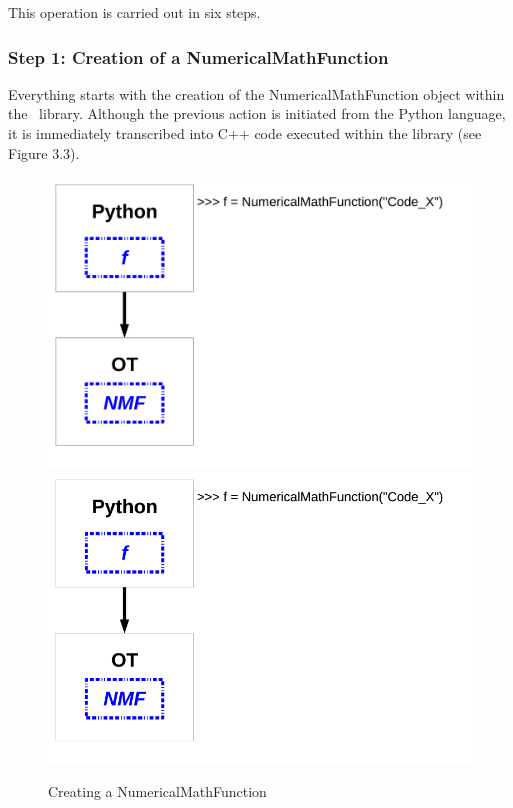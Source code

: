 This operation is carried out in six steps.

\subsubsection{Step 1: Creation of a NumericalMathFunction}

Everything starts with the creation of the NumericalMathFunction object within the \OT\ library. Although the previous action is initiated from the Python language, it is immediately transcribed into C++ code executed within the library (see Figure 3.3).

\begin{figure}
  \begin{center}
    \ifpdf
    \includegraphics[width=12cm]{Figure3.pdf}
    \else
    \includegraphics[width=12cm]{Figure3.png}
    \fi
    \caption[Figure 3]{Creating a NumericalMathFunction}
  \end{center}
\end{figure}

